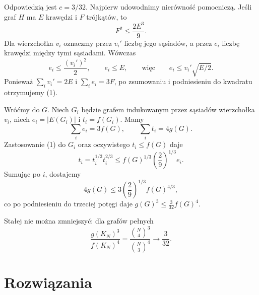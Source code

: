 \documentclass{lecture-kuznia}
\newcommand{\drukujrozwiazania}{}
\begin{document}
\begin{solutionbox}
Odpowiedzią jest $c=3/32$. Najpierw udowodnimy nierówność pomocniczą. Jeśli
graf $H$ ma $E$ krawędzi i $F$ trójkątów, to
\[
  F^2\leqslant\frac{2E^3}{9}. \tag{1}
\]
Dla wierzchołka $v_i$ oznaczmy przez $v_i'$ liczbę jego sąsiadów, a przez
$e_i$ liczbę krawędzi między tymi sąsiadami. Wówczas
\[
  e_i\leqslant\frac{(v_i')^2}{2},\qquad e_i\leqslant E,
  \qquad\text{więc}\qquad e_i\leqslant v_i'\sqrt{E/2}.
\]
Ponieważ $\sum_i v_i'=2E$ i $\sum_i e_i=3F$, po zsumowaniu i podniesieniu
do kwadratu otrzymujemy (1).

Wróćmy do $G$. Niech $G_i$ będzie grafem indukowanym przez sąsiadów
wierzchołka $v_i$, niech $e_i=|E(G_i)|$ i $t_i=f(G_i)$. Mamy
\[
  \sum_i e_i=3f(G),\qquad \sum_i t_i=4g(G).
\]
Zastosowanie (1) do $G_i$ oraz oczywistego $t_i\leqslant f(G)$ daje
\[
  t_i=t_i^{1/3}t_i^{2/3}
  \leqslant f(G)^{1/3}\left(\frac29\right)^{1/3}e_i.
\]
Sumując po $i$, dostajemy
\[
  4g(G)\leqslant3\left(\frac29\right)^{1/3}f(G)^{4/3},
\]
co po podniesieniu do trzeciej potęgi daje
$g(G)^3\leqslant\frac3{32}f(G)^4$.

Stałej nie można zmniejszyć: dla grafów pełnych
\[
  \frac{g(K_N)^3}{f(K_N)^4}
  =\frac{\binom{N}{4}^3}{\binom{N}{3}^4}
  \longrightarrow\frac3{32}.
\]
\end{solutionbox}
\ifshowsolutions
\newpage
\section{Rozwiązania}
\drukujrozwiazania
\fi
\end{document}
